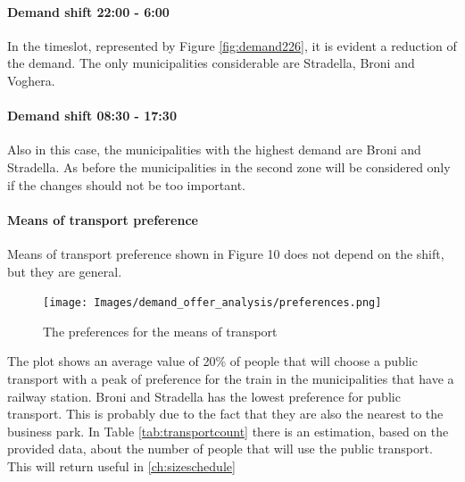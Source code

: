 \paragraph{Demand shift  22:00 - 6:00}
In the timeslot, represented by Figure \ref{fig:demand226}, it is evident a reduction of the demand. The only municipalities considerable are Stradella, Broni and Voghera.


\paragraph{Demand shift 08:30 - 17:30}
Also in this case, the municipalities with the highest demand are Broni and Stradella. As before the municipalities in the second zone will be considered only if the changes should not be too important.

\begin{figure}
\centering
{}\hfill
{}
\end{figure}

\begin{figure}
    \centering
{}\hfill
{}
\end{figure}

\paragraph{Means of transport preference}
Means of transport preference shown in Figure 10 does not depend on the shift, but they are general. 

\begin{figure}[h]
    \centering
    \texttt{[image: Images/demand\_offer\_analysis/preferences.png]}
    \caption{The preferences for the means of transport}
    \label{fig:meantransport}
\end{figure}

The plot shows an average value of 20\% of people that will choose a public transport  with a peak of preference for the train in the municipalities that have a railway station.
Broni and Stradella has the lowest preference for public transport. This is probably due to the fact that they are also the nearest to the business park.
In Table \ref{tab:transportcount} there is an estimation, based on the provided data, about the number of people that will use the public transport. This will return useful in \ref{ch:sizeschedule}
\newpage

\newpage

